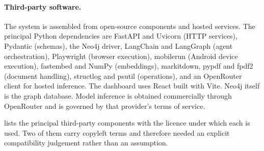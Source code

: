 \paragraph{Third-party software.} The system is assembled from open-source
components and hosted services. The principal Python dependencies are FastAPI
and Uvicorn (HTTP services), Pydantic (schemas), the Neo4j driver, LangChain
and LangGraph (agent orchestration), Playwright (browser execution), mobilerun
(Android device execution), fastembed and NumPy (embeddings), markitdown, pypdf
and fpdf2 (document handling), structlog and psutil (operations), and an
OpenRouter client for hosted inference. The dashboard uses React built with
Vite. Neo4j itself is the graph database. Model inference is obtained
commercially through OpenRouter and is governed by that provider's terms of
service.

 lists the principal third-party components with the licence
under which each is used. Two of them carry copyleft terms and therefore needed
an explicit compatibility judgement rather than an assumption.

